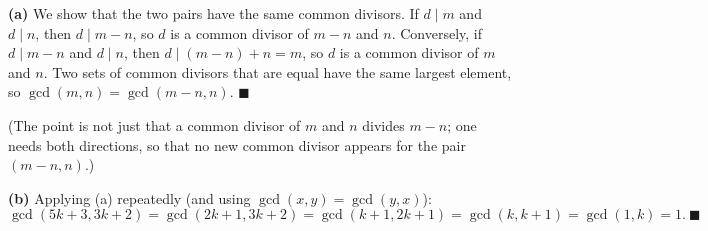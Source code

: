 \textbf{(a)} We show that the two pairs have the same common divisors. If $d\mid m$ and $d\mid n$, then $d\mid m-n$, so $d$ is a common divisor of $m-n$ and $n$. Conversely, if $d\mid m-n$ and $d\mid n$, then $d\mid(m-n)+n=m$, so $d$ is a common divisor of $m$ and $n$. Two sets of common divisors that are equal have the same largest element, so $\gcd(m,n)=\gcd(m-n,n)$. $\blacksquare$

(The point is not just that a common divisor of $m$ and $n$ divides $m-n$; one needs both directions, so that no new common divisor appears for the pair $(m-n,n)$.)

\textbf{(b)} Applying (a) repeatedly (and using $\gcd(x,y)=\gcd(y,x)$):
\[\gcd(5k+3,3k+2)=\gcd(2k+1,3k+2)=\gcd(k+1,2k+1)=\gcd(k,k+1)=\gcd(1,k)=1.\ \blacksquare\]
